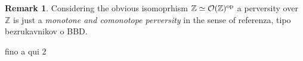 \documentclass{article}
\newtheorem{prop}[thm]{Proposition}
\theoremstyle{definition}
\newtheorem{rem}[thm]{Remark}
\newcommand{\Z}{\mathbb{Z}}
\newcommand{\Oo}{\mathcal{O}}
\newcommand{\op}{\textnormal{op}}
\begin{document}
\begin{rem}
Considering the obvious isomoprhism $\Z \simeq \Oo(\Z)^\op$ a perversity over $\mathbb{Z}$ is just a \textit{monotone and comonotope perversity} in the sense of {\color{red} referenza, tipo bezrukavnikov o BBD}. 
\end{rem}










{\Huge fino a qui 2}

%
%
\end{document}
